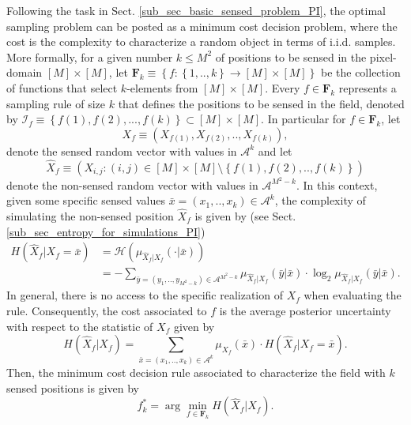 Following the task in Sect. \ref{sub_sec_basic_sensed_problem_PI}, the optimal sampling problem can be posted as a minimum cost decision problem, where the cost is the complexity to characterize a random object in terms of i.i.d. samples. More formally, for a given number $k\leq M^2$ of positions to be sensed in the pixel-domain $[M] \times [M]$, let $\mathbf{F}_k \equiv \left\{ f:\left\{1,..,k\right\} \rightarrow [M] \times [M] \right\}$ be the collection of functions that select $k$-elements from $[M] \times [M]$.  Every $f\in \mathbf{F}_k$ represents  a sampling rule of size $k$ that defines the positions to be sensed in the field, denoted by $\mathcal{I}_f \equiv \left\{ f(1),f(2),...,f(k) \right\}\subset [M] \times [M]$. 
In particular for $f\in  \mathbf{F}_k$, let
\begin{equation}\label{eq_sec_owp_PI_1}
X_f \equiv ( X_{f(1)},X_{f(2)},..,X_{f(k)}), 
\end{equation}
denote the sensed random vector with values in $\mathcal{A}^k$ and let
\begin{equation}\label{eq_sec_owp_PI_2}
\hat{X}_f \equiv (X_{i,j}: (i,j)\in [M] \times [M] \setminus \left\{f(1),f(2),..,f(k)\right\} )
\end{equation}
denote the non-sensed random vector with values in $\mathcal{A}^{M^2-k}$. In this context, given some specific sensed values $\bar{x}=(x_1,..,x_k)\in \mathcal{A}^k$, the complexity of simulating the non-sensed position $\hat{X}_f$ is given by (see Sect. \ref{sub_sec_entropy_for_simulations_PI})
\begin{align}\label{eq_sec_owp_PI_3}
H(\hat{X}_f| {X}_f=\bar{x}) &= \mathcal{H}(\mu_{\hat{X}_f| {X}_f}(\cdot | \bar{x}) ) \nonumber\\ 
& = - \sum_{\bar{y}=(y_1,.., y_{M^2-k})\in \mathcal{A}^{M^2-k}}  \mu_{\hat{X}_f| {X}_f} (\bar{y}|\bar{x}) \cdot \log_2 \mu_{\hat{X}_f| {X}_f} (\bar{y}|\bar{x}).
\end{align}
In general, there is no access to the specific realization of $X_f$ when evaluating the rule. Consequently, the cost associated to $f$ is the average posterior uncertainty with respect to the statistic of ${X}_f$ given by
\begin{equation}\label{eq_sec_owp_PI_4}
H(\hat{X}_f| {X}_f) =  \sum_{\bar{x}=(x_1,..,x_{k})\in \mathcal{A}^k} \mu_{{X}_f} (\bar{x}) \cdot H(\hat{X}_f| {X}_f=\bar{x}).
\end{equation}
Then, the minimum cost decision rule  associated to characterize the field with $k$ sensed positions is given by
\begin{equation}\label{eq_sec_owp_PI_5}
	f^*_k = \arg \min_{f\in \mathbf{F}_k} H(\hat{X}_f| {X}_f).
\end{equation}

